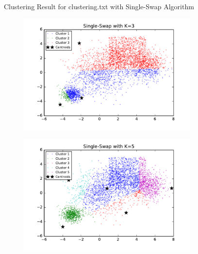 \begin{description}
\begin{description}
\begin{figure}[!h]
\begin{subfigure}[b]{0.475\textwidth}
        \end{subfigure}        
        \caption{Clustering Result for clustering.txt with Single-Swap Algorithm}
        \label{fig:single-swap-clusterimg}
\end{figure}

\begin{figure}[!h]
        \centering
        \begin{subfigure}[b]{0.475\textwidth}
            \centering
            \includegraphics[width=\textwidth]{./figures/bigClustering_singleSwap_3.pdf}
        \end{subfigure}
        \hfill    
        \begin{subfigure}[b]{0.475\textwidth}  
            \centering 
            \includegraphics[width=\textwidth]{./figures/bigClustering_singleSwap_5.pdf}

\end{subfigure}
\end{figure}
\end{description}
\end{description}
